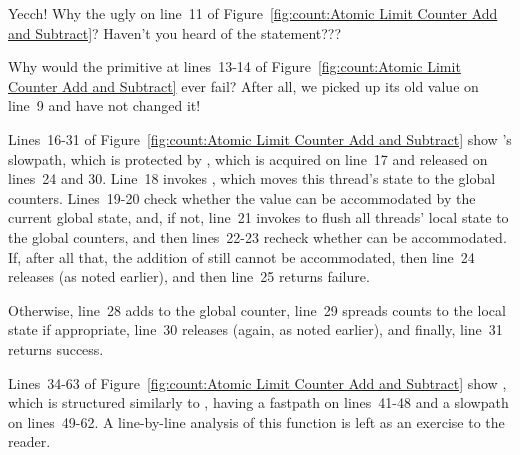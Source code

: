 \QuickQuiz{}
	Yecch!
	Why the ugly  on line~11 of
	Figure~\ref{fig:count:Atomic Limit Counter Add and Subtract}?
	Haven't you heard of the  statement???
 \QuickQuizEnd

\QuickQuiz{}
	Why would the  primitive at lines~13-14 of
	Figure~\ref{fig:count:Atomic Limit Counter Add and Subtract}
	ever fail?
	After all, we picked up its old value on line~9 and have not
	changed it!
 \QuickQuizEnd

Lines~16-31 of
Figure~\ref{fig:count:Atomic Limit Counter Add and Subtract}
show 's slowpath, which is protected by ,
which is acquired on line~17 and released on lines~24 and 30.
Line~18 invokes , which moves this thread's
state to the global counters.
Lines~19-20 check whether the  value can be accommodated by
the current global state, and, if not, line~21 invokes
 to flush all threads' local state to the
global counters, and then lines~22-23 recheck whether  can
be accommodated.
If, after all that, the addition of  still cannot be accommodated,
then line~24 releases  (as noted earlier), and
then line~25 returns failure.

Otherwise, line~28 adds  to the global counter, line~29
spreads counts to the local state if appropriate, line~30 releases
 (again, as noted earlier), and finally, line~31
returns success.

Lines~34-63 of
Figure~\ref{fig:count:Atomic Limit Counter Add and Subtract}
show , which is structured similarly to
, having a fastpath on lines~41-48 and a slowpath on
lines~49-62.
A line-by-line analysis of this function is left as an exercise to
the reader.

